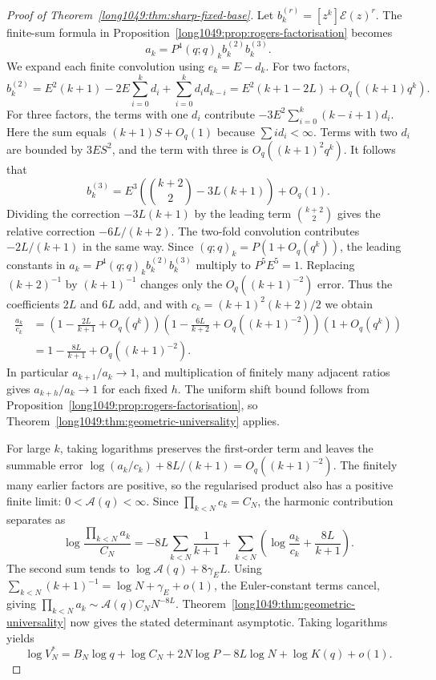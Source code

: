 \begin{proof}[Proof of Theorem~\ref{long1049:thm:sharp-fixed-base}]
Let $b_k^{(r)}=[z^k]\mathcal E(z)^r$. The finite-sum formula in
Proposition~\ref{long1049:prop:rogers-factorisation} becomes
\[
 a_k=P^4(q;q)_k b_k^{(2)}b_k^{(3)}.
\]
We expand each finite convolution using $e_k=E-d_k$. For two factors,
\[
 b_k^{(2)}=E^2(k+1)-2E\sum_{i=0}^k d_i
              +\sum_{i=0}^k d_i d_{k-i}
 =E^2(k+1-2L)+O_q((k+1)q^k).
\]
For three factors, the terms with one $d_i$ contribute
$-3E^2\sum_{i=0}^k(k-i+1)d_i$.
Here the sum equals $(k+1)S+O_q(1)$ because
$\sum i d_i<\infty$. Terms with two $d_i$ are bounded by
$3E S^2$, and the term with three is $O_q((k+1)^2q^k)$.
It follows that
\[
 b_k^{(3)}=E^3\left(\binom{k+2}{2}-3L(k+1)\right)+O_q(1).
\]
Dividing the correction $-3L(k+1)$ by the leading term
$\binom{k+2}{2}$ gives the relative correction $-6L/(k+2)$.
The two-fold convolution contributes $-2L/(k+1)$ in the same way.
Since $(q;q)_k=P(1+O_q(q^k))$, the leading constants in
$a_k=P^4(q;q)_k b_k^{(2)}b_k^{(3)}$ multiply to $P^5E^5=1$.
Replacing $(k+2)^{-1}$ by $(k+1)^{-1}$ changes only the
$O_q((k+1)^{-2})$ error. Thus the coefficients $2L$ and $6L$ add,
and with $c_k=(k+1)^2(k+2)/2$ we obtain
\begin{align*}
 \frac{a_k}{c_k}
 &=\left(1-\frac{2L}{k+1}+O_q(q^k)\right)
   \left(1-\frac{6L}{k+2}+O_q((k+1)^{-2})\right)
   \left(1+O_q(q^k)\right)\\
 &=1-\frac{8L}{k+1}+O_q((k+1)^{-2}).
\end{align*}
In particular $a_{k+1}/a_k\to1$, and multiplication of finitely
many adjacent ratios gives $a_{k+h}/a_k\to1$ for each fixed $h$.
The uniform shift bound follows from
Proposition~\ref{long1049:prop:rogers-factorisation}, so
Theorem~\ref{long1049:thm:geometric-universality} applies.

For large $k$, taking logarithms preserves the first-order term and
leaves the summable error
$\log(a_k/c_k)+8L/(k+1)=O_q((k+1)^{-2})$.
The finitely many earlier factors are positive, so the regularised
product also has a positive finite limit: $0<\mathcal A(q)<\infty$.
Since $\prod_{k<N}c_k=C_N$, the harmonic contribution separates as
\[
 \log\frac{\prod_{k<N}a_k}{C_N}
 =-8L\sum_{k<N}\frac1{k+1}
  +\sum_{k<N}\left(\log\frac{a_k}{c_k}+\frac{8L}{k+1}\right).
\]
The second sum tends to $\log\mathcal A(q)+8\gamma_{\!E}L$.
Using $\sum_{k<N}(k+1)^{-1}=\log N+\gamma_{\!E}+o(1)$,
the Euler-constant terms cancel, giving
$\prod_{k<N}a_k\sim\mathcal A(q)C_NN^{-8L}$.
Theorem~\ref{long1049:thm:geometric-universality} now gives the
stated determinant asymptotic. Taking logarithms yields
\[
 \log V_N^*=B_N\log q+\log C_N+2N\log P
             -8L\log N+\log K(q)+o(1).
\]
\end{proof}

